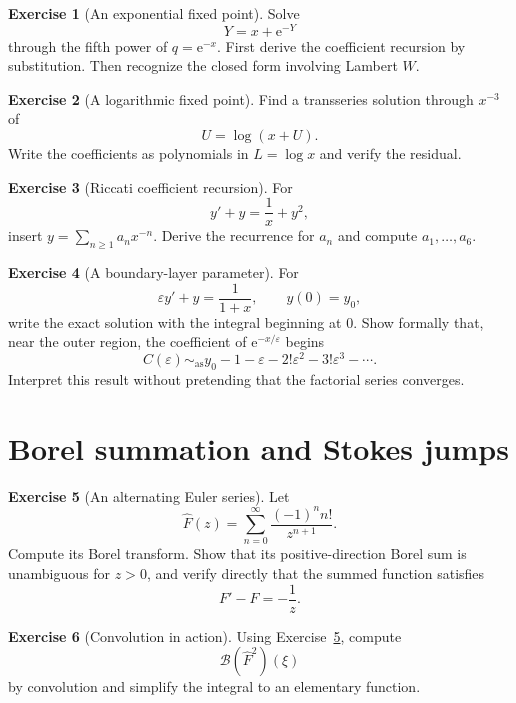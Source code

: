 \documentclass[11pt,oneside]{book}
\theoremstyle{definition}
\newtheorem{exercise}{Exercise}[chapter]
\theoremstyle{remark}
\newcommand{\Borel}{\mathcal{B}}
\newcommand{\asympseries}{\sim_{\!\mathrm{as}}}
\newcommand{\e}{\mathrm{e}}
\newcommand{\eps}{\varepsilon}
\begin{document}
\begin{exercise}[An exponential fixed point]
\label{ex:exp-fixed-point}
Solve
\[
  Y=x+\e^{-Y}
\]
through the fifth power of $q=\e^{-x}$. First derive the coefficient recursion by
substitution. Then recognize the closed form involving Lambert $W$.
\end{exercise}

\begin{exercise}[A logarithmic fixed point]
\label{ex:log-fixed-point}
Find a transseries solution through $x^{-3}$ of
\[
  U=\log(x+U).
\]
Write the coefficients as polynomials in $L=\log x$ and verify the residual.
\end{exercise}

\begin{exercise}[Riccati coefficient recursion]
\label{ex:riccati-recursion}
For
\[
  y'+y=\frac1x+y^2,
\]
insert $y=\sum_{n\ge1}a_nx^{-n}$. Derive the recurrence for $a_n$ and compute
$a_1,\ldots,a_6$.
\end{exercise}

\begin{exercise}[A boundary-layer parameter]
\label{ex:boundary-layer-parameter}
For
\[
  \eps y'+y=\frac1{1+x},\qquad y(0)=y_0,
\]
write the exact solution with the integral beginning at $0$. Show formally that,
near the outer region, the coefficient of $\e^{-x/\eps}$ begins
\[
  C(\eps)\asympseries
  y_0-1-\eps-2!\eps^2-3!\eps^3-\cdots.
\]
Interpret this result without pretending that the factorial series converges.
\end{exercise}

\section{Borel summation and Stokes jumps}

\begin{exercise}[An alternating Euler series]
\label{ex:alternating-euler}
Let
\[
  \widehat F(z)=\sum_{n=0}^{\infty}\frac{(-1)^n n!}{z^{n+1}}.
\]
Compute its Borel transform. Show that its positive-direction Borel sum is
unambiguous for $z>0$, and verify directly that the summed function satisfies
\[
  F'-F=-\frac1z.
\]
\end{exercise}

\begin{exercise}[Convolution in action]
\label{ex:borel-convolution}
Using Exercise~\ref{ex:alternating-euler}, compute
\[
  \Borel(\widehat F^2)(\xi)
\]
by convolution and simplify the integral to an elementary function.
\end{exercise}
\end{document}
